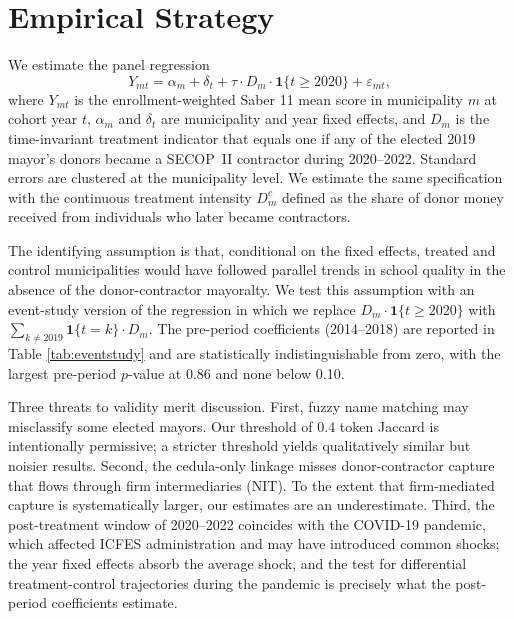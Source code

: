 \documentclass[12pt]{article}
\begin{document}
\begin{table}[h!]
\centering
\caption{Summary statistics, 2019 baseline cross-section}

\label{tab:summary}
\end{table}

\section{Empirical Strategy}

We estimate the panel regression
\begin{equation}
Y_{mt} = \alpha_m + \delta_t + \tau \cdot D_m \cdot \mathbf{1}\{t \geq 2020\} + \varepsilon_{mt},
\end{equation}
where $Y_{mt}$ is the enrollment-weighted Saber 11 mean score in municipality $m$ at cohort year $t$, $\alpha_m$ and $\delta_t$ are municipality and year fixed effects, and $D_m$ is the time-invariant treatment indicator that equals one if any of the elected 2019 mayor's donors became a SECOP~II contractor during 2020--2022. Standard errors are clustered at the municipality level. We estimate the same specification with the continuous treatment intensity $D_m^c$ defined as the share of donor money received from individuals who later became contractors.

The identifying assumption is that, conditional on the fixed effects, treated and control municipalities would have followed parallel trends in school quality in the absence of the donor-contractor mayoralty. We test this assumption with an event-study version of the regression in which we replace $D_m \cdot \mathbf{1}\{t \geq 2020\}$ with $\sum_{k \neq 2019} \mathbf{1}\{t = k\} \cdot D_m$. The pre-period coefficients (2014--2018) are reported in Table \ref{tab:eventstudy} and are statistically indistinguishable from zero, with the largest pre-period $p$-value at 0.86 and none below 0.10.

Three threats to validity merit discussion. First, fuzzy name matching may misclassify some elected mayors. Our threshold of 0.4 token Jaccard is intentionally permissive; a stricter threshold yields qualitatively similar but noisier results. Second, the cedula-only linkage misses donor-contractor capture that flows through firm intermediaries (NIT). To the extent that firm-mediated capture is systematically larger, our estimates are an underestimate. Third, the post-treatment window of 2020--2022 coincides with the COVID-19 pandemic, which affected ICFES administration and may have introduced common shocks; the year fixed effects absorb the average shock, and the test for differential treatment-control trajectories during the pandemic is precisely what the post-period coefficients estimate.
\end{document}
